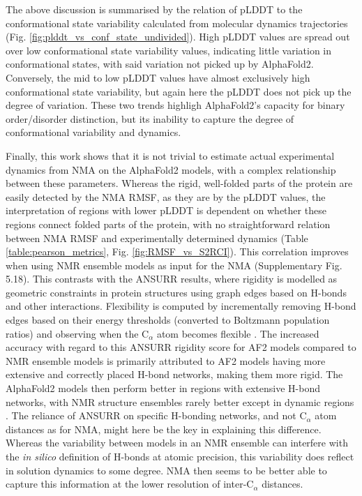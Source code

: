 The above discussion is summarised by the relation of pLDDT to the conformational state variability calculated from molecular dynamics trajectories (Fig. \ref{fig:plddt_vs_conf_state_undivided}). High pLDDT values are spread out over low conformational state variability values, indicating little variation in conformational states, with said variation not picked up by AlphaFold2. Conversely, the mid to low pLDDT values have almost exclusively high conformational state variability, but again here the pLDDT does not pick up the degree of variation. These two trends highligh AlphaFold2's capacity for binary order/disorder distinction, but its inability to capture the degree of conformational variability and dynamics.

Finally, this work shows that it is not trivial to estimate actual experimental dynamics from NMA on the AlphaFold2 models, with a complex relationship between these parameters. Whereas the rigid, well-folded parts of the protein are easily detected by the NMA RMSF, as they are by the pLDDT values, the interpretation of regions with lower pLDDT is dependent on whether these regions connect folded parts of the protein, with no straightforward relation between NMA RMSF and experimentally determined dynamics (Table \ref{table:pearson_metrics}, Fig. \ref{fig:RMSF_vs_S2RCI}). This correlation improves when using NMR ensemble models as input for the NMA (Supplementary Fig. 5.18).
This contrasts with the ANSURR results, where rigidity is modelled as geometric constraints in protein structures using graph edges based on H-bonds and other interactions. Flexibility is computed by incrementally removing H-bond edges based on their energy thresholds (converted to Boltzmann population ratios) and observing when the C$_\alpha$ atom becomes flexible \cite{fowler2020method}. The increased accuracy with regard to this ANSURR rigidity score for AF2 models compared to NMR ensemble models is primarily attributed to AF2 models having more extensive and correctly placed H-bond networks, making them more rigid. The AlphaFold2 models then perform better in regions with extensive H-bond networks, with NMR structure ensembles rarely better except in dynamic regions \cite{fowler2022accuracy}. The reliance of ANSURR on specific H-bonding networks, and not C$_\alpha$ atom distances as for NMA, might here be the key in explaining this difference. Whereas the variability between models in an NMR ensemble can interfere with the \textit{in silico} definition of H-bonds at atomic precision, this variability does reflect in solution dynamics to some degree. NMA then seems to be better able to capture this information at the lower resolution of inter-C$_\alpha$ distances.  

